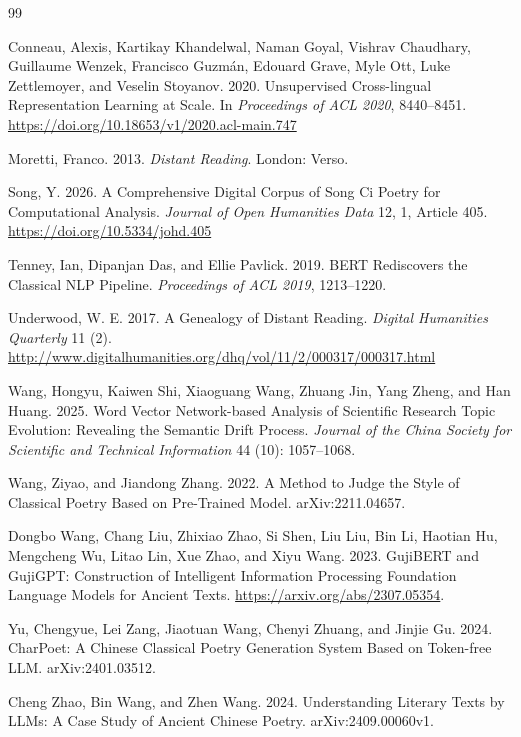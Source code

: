 \documentclass[12pt,a4paper]{article}
\numberwithin{equation}{section}
\begin{document}
{\begin{thebibliography}{99}
\item Conneau, Alexis, Kartikay Khandelwal, Naman Goyal, Vishrav Chaudhary, Guillaume Wenzek, Francisco Guzmán, Edouard Grave, Myle Ott, Luke Zettlemoyer, and Veselin Stoyanov. 2020. Unsupervised Cross-lingual Representation Learning at Scale. In \textit{Proceedings of ACL 2020}, 8440--8451. \url{https://doi.org/10.18653/v1/2020.acl-main.747}

\item Moretti, Franco. 2013. \textit{Distant Reading}. London: Verso.

\item Song, Y. 2026. A Comprehensive Digital Corpus of Song Ci Poetry for Computational Analysis. \textit{Journal of Open Humanities Data} 12, 1, Article 405. \url{https://doi.org/10.5334/johd.405}

\item Tenney, Ian, Dipanjan Das, and Ellie Pavlick. 2019. BERT Rediscovers the Classical NLP Pipeline. \textit{Proceedings of ACL 2019}, 1213--1220.

\item Underwood, W. E. 2017. A Genealogy of Distant Reading. \textit{Digital Humanities Quarterly} 11 (2). \url{http://www.digitalhumanities.org/dhq/vol/11/2/000317/000317.html}

\item Wang, Hongyu, Kaiwen Shi, Xiaoguang Wang, Zhuang Jin, Yang Zheng, and Han Huang. 2025. Word Vector Network-based Analysis of Scientific Research Topic Evolution: Revealing the Semantic Drift Process. \textit{Journal of the China Society for Scientific and Technical Information} 44 (10): 1057--1068.

\item Wang, Ziyao, and Jiandong Zhang. 2022. A Method to Judge the Style of Classical Poetry Based on Pre-Trained Model. arXiv:2211.04657.

\item Dongbo Wang, Chang Liu, Zhixiao Zhao, Si Shen, Liu Liu, Bin Li, Haotian Hu, Mengcheng Wu, Litao Lin, Xue Zhao, and Xiyu Wang. 2023. GujiBERT and GujiGPT: Construction of Intelligent Information Processing Foundation Language Models for Ancient Texts. \url{https://arxiv.org/abs/2307.05354}.

\item Yu, Chengyue, Lei Zang, Jiaotuan Wang, Chenyi Zhuang, and Jinjie Gu. 2024. CharPoet: A Chinese Classical Poetry Generation System Based on Token-free LLM. arXiv:2401.03512.

\item Cheng Zhao, Bin Wang, and Zhen Wang. 2024. Understanding Literary Texts by LLMs: A Case Study of Ancient Chinese Poetry. arXiv:2409.00060v1.


\end{thebibliography}}
\end{document}
